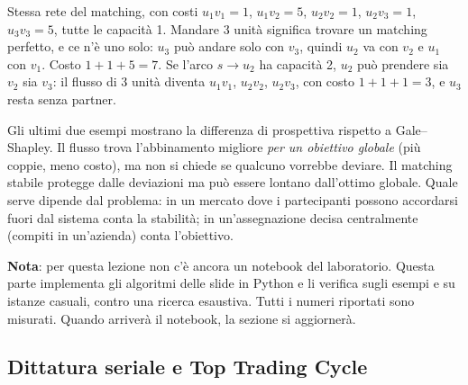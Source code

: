 \begin{esempio}[le slide]
Stessa rete del matching, con costi $u_1v_1 = 1$, $u_1v_2 = 5$, $u_2v_2 = 1$, $u_2v_3 = 1$,
$u_3v_3 = 5$, tutte le capacità 1. Mandare 3 unità significa trovare un matching perfetto, e
ce n'è uno solo: $u_3$ può andare solo con $v_3$, quindi $u_2$ va con $v_2$ e $u_1$ con
$v_1$. Costo $1 + 1 + 5 = 7$. Se l'arco $s \to u_2$ ha capacità 2, $u_2$ può prendere sia
$v_2$ sia $v_3$: il flusso di 3 unità diventa $u_1v_1$, $u_2v_2$, $u_2v_3$, con costo
$1 + 1 + 1 = 3$, e $u_3$ resta senza partner.
\end{esempio}

\begin{osservazione}
Gli ultimi due esempi mostrano la differenza di prospettiva rispetto a Gale--Shapley.
Il flusso trova l'abbinamento migliore \emph{per un obiettivo globale} (più coppie, meno
costo), ma non si chiede se qualcuno vorrebbe deviare. Il matching stabile protegge dalle
deviazioni ma può essere lontano dall'ottimo globale. Quale serve dipende dal problema: in
un mercato dove i partecipanti possono accordarsi fuori dal sistema conta la stabilità; in
un'assegnazione decisa centralmente (compiti in un'azienda) conta l'obiettivo.
\end{osservazione}


\textbf{Nota}: per questa lezione non c'è ancora un notebook del laboratorio. Questa parte
implementa gli algoritmi delle slide in Python e li verifica sugli esempi e su istanze
casuali, contro una ricerca esaustiva. Tutti i numeri riportati sono misurati. Quando
arriverà il notebook, la sezione si aggiornerà.

\subsection{Dittatura seriale e Top Trading Cycle}

